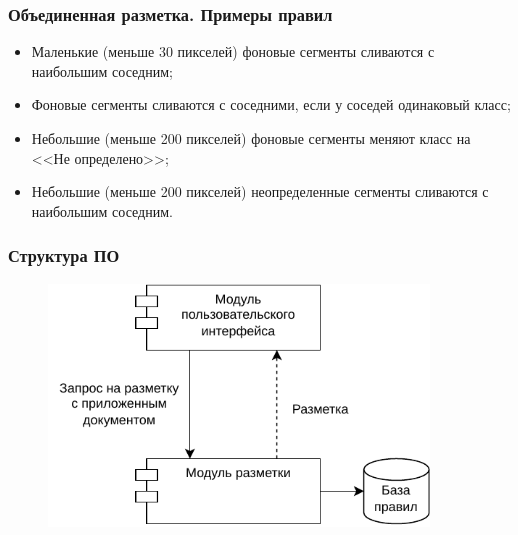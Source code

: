 \documentclass[gray]{beamer}
\begin{document}
\begin{frame}
    \frametitle{Объединенная разметка. Примеры правил}
    \begin{itemize}
        \item Маленькие (меньше 30 пикселей) фоновые сегменты сливаются с наибольшим соседним;
        \item Фоновые сегменты сливаются с соседними, если у соседей одинаковый класс;
        \item Небольшие (меньше 200 пикселей) фоновые сегменты меняют класс на <<Не определено>>;
        \item Небольшие (меньше 200 пикселей) неопределенные сегменты сливаются с наибольшим соседним.
    \end{itemize}
\end{frame}

\begin{frame}
    \frametitle{Структура ПО}
    \begin{figure}[H]
        \centering
        \hspace{-1.5cm}\includegraphics[width=0.9\textwidth]{diag/components.pdf}
    \end{figure}
\end{frame}
\end{document}
